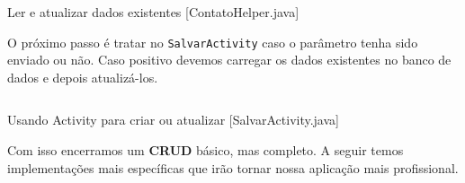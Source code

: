 \begin{listing}[H]
  \inputminted[linenos=true,frame=bottomline,tabsize=3]{ java }{ source/ContatoHelper-4.java }
  \caption{Ler e atualizar dados existentes [ContatoHelper.java]}
\end{listing}

O próximo passo é tratar no \texttt{SalvarActivity} caso o parâmetro
tenha sido enviado ou não. Caso positivo devemos carregar os dados
existentes no banco de dados e depois atualizá-los.

\begin{listing}[H]
  \inputminted[linenos=true,frame=bottomline,tabsize=3]{ java }{ source/SalvarActivity-3.java }
  \caption{Usando Activity para criar ou atualizar [SalvarActivity.java]}
\end{listing}

Com isso encerramos um \textbf{CRUD} básico, mas completo. A seguir
temos implementações mais específicas que irão tornar nossa aplicação
mais profissional.
